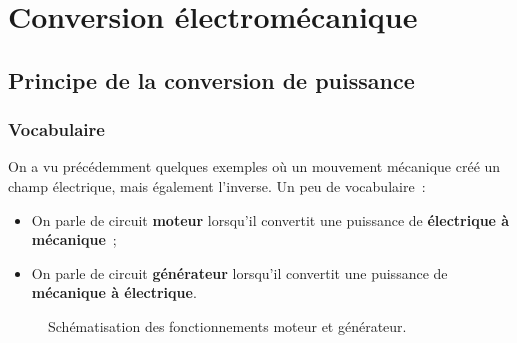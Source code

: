 \documentclass[../main/main.tex]{subfiles}
\begin{document}
\setcounter{chapter}{3}
\chapter{Conversion électromécanique}
\label{ch:convelecmeca}

\section{Principe de la conversion de puissance}
\label{sec:convelecmeca}
\subsection{Vocabulaire}
\label{ssec:voca}

On a vu précédemment quelques exemples où un mouvement mécanique créé un champ
électrique, mais également l'inverse. Un peu de vocabulaire~:
\begin{itemize}[label=$\diamond$, leftmargin=10pt]
	\item On parle de circuit \textbf{moteur} lorsqu'il convertit une puissance
	      de \textbf{électrique à mécanique}~;
	\item On parle de circuit \textbf{générateur} lorsqu'il convertit une puissance
	      de \textbf{mécanique à électrique}.
\end{itemize}
\begin{figure}[h]
	\centering
	\caption{Schématisation des fonctionnements moteur et générateur.}
	\label{fig:motgene}
\end{figure}
\vspace*{-20pt}
\end{document}
